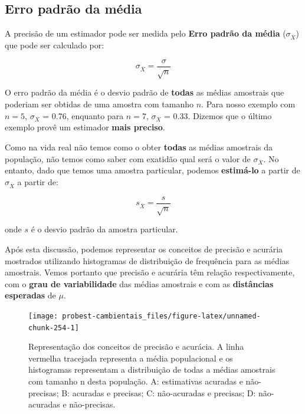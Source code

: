 \documentclass[
]{book}
\begin{document}
\hypertarget{erro-padruxe3o-da-muxe9dia}{%
\subsection{Erro padrão da média}\label{erro-padruxe3o-da-muxe9dia}}

A precisão de um estimador pode ser medida pelo \textbf{Erro padrão da média} (\(\sigma_{\overline{X}}\)) que pode ser calculado por:

\[\sigma_{\overline{X}} = \frac{\sigma}{\sqrt{n}}\]

O erro padrão da média é o desvio padrão de \textbf{todas} as médias amostrais que poderiam ser obtidas de uma amostra com tamanho \(n\). Para nosso exemplo com \(n = 5\), \(\sigma_{\overline{X}}\) = 0.76, enquanto para \(n = 7\), \(\sigma_{\overline{X}}\) = 0.33. Dizemos que o último exemplo provê um estimador \textbf{mais preciso}.

Como na vida real não temos como o obter \textbf{todas} as médias amostrais da população, não temos como saber com exatidão qual será o valor de \(\sigma_{\overline{X}}\). No entanto, dado que temos uma amostra particular, podemos \textbf{estimá-lo} a partir de \(\sigma_{\overline{X}}\) a partir de:

\[s_{\overline{X}} = \frac{s}{\sqrt{n}}\]

onde \(s\) é o desvio padrão da amostra particular.

Após esta discussão, podemos representar os conceitos de precisão e acurária mostrados utilizando histogramas de distribuição de frequência para as médias amostrais. Vemos portanto que precisão e acurária têm relação respectivamente, com o \textbf{grau de variabilidade} das médias amostrais e com as \textbf{distâncias esperadas} de \(\mu\).

\begin{figure}

{\centering \texttt{[image: probest-cambientais\_files/figure-latex/unnamed-chunk-254-1]} 

}

\caption{Representação dos conceitos de precisão e acurácia. A linha vermelha tracejada representa a média populacional e os histogramas representam a distribuição de todas a médias amostrais com tamanho n desta população. A: estimativas acuradas e não-precisas; B: acuradas e precisas; C: não-acuradas e precisas; D: não-acuradas e não-precisas.}\label{fig:unnamed-chunk-254}
\end{figure}
\end{document}
